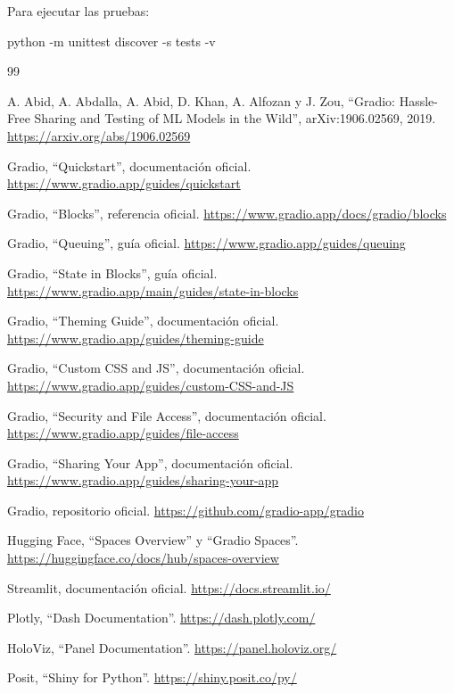 \documentclass[11pt,letterpaper]{article}
\begin{document}
Para ejecutar las pruebas:

\begin{codeblock}
python -m unittest discover -s tests -v
\end{codeblock}

\begin{thebibliography}{99}

A. Abid, A. Abdalla, A. Abid, D. Khan, A. Alfozan y J. Zou,
``Gradio: Hassle-Free Sharing and Testing of ML Models in the Wild'',
arXiv:1906.02569, 2019.
\url{https://arxiv.org/abs/1906.02569}

Gradio, ``Quickstart'', documentación oficial.
\url{https://www.gradio.app/guides/quickstart}

Gradio, ``Blocks'', referencia oficial.
\url{https://www.gradio.app/docs/gradio/blocks}

Gradio, ``Queuing'', guía oficial.
\url{https://www.gradio.app/guides/queuing}

Gradio, ``State in Blocks'', guía oficial.
\url{https://www.gradio.app/main/guides/state-in-blocks}

Gradio, ``Theming Guide'', documentación oficial.
\url{https://www.gradio.app/guides/theming-guide}

Gradio, ``Custom CSS and JS'', documentación oficial.
\url{https://www.gradio.app/guides/custom-CSS-and-JS}

Gradio, ``Security and File Access'', documentación oficial.
\url{https://www.gradio.app/guides/file-access}

Gradio, ``Sharing Your App'', documentación oficial.
\url{https://www.gradio.app/guides/sharing-your-app}

Gradio, repositorio oficial.
\url{https://github.com/gradio-app/gradio}

Hugging Face, ``Spaces Overview'' y ``Gradio Spaces''.
\url{https://huggingface.co/docs/hub/spaces-overview}

Streamlit, documentación oficial.
\url{https://docs.streamlit.io/}

Plotly, ``Dash Documentation''.
\url{https://dash.plotly.com/}

HoloViz, ``Panel Documentation''.
\url{https://panel.holoviz.org/}

Posit, ``Shiny for Python''.
\url{https://shiny.posit.co/py/}

\end{thebibliography}
\end{document}
